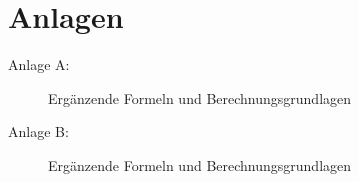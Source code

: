 \cleardoublepage
\appendix
{}
\chapter*{Anlagen}

\begin{description}
\item[Anlage A:] Ergänzende Formeln und Berechnungsgrundlagen\hfill \\
\item[Anlage B:] Ergänzende Formeln und Berechnungsgrundlagen\hfill \\
\end{description}
